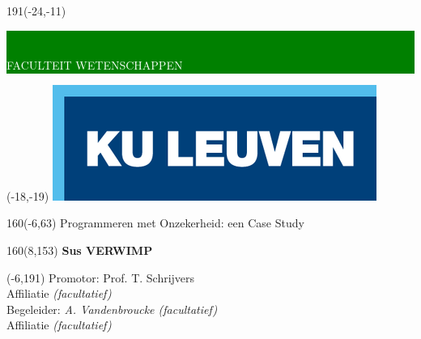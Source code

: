 \documentclass[12pt,a4paper,oneside]{book}
\begin{document}
\thispagestyle{empty}
\newcommand{\form}[1]{\scalebox{1.087}{\boldmath{#1}}}
\sffamily
%
\begin{textblock}{191}(-24,-11)
\colorbox{green}{\hspace{123mm}\ \parbox[c][18truemm]{68mm}{\textcolor{white}{FACULTEIT WETENSCHAPPEN}}}
\end{textblock}
%
\begin{textblock}{70}(-18,-19)
\textblockcolour{}
\includegraphics*[height=19.8truemm]{LogoKULeuven}
\end{textblock}
%
\begin{textblock}{160}(-6,63)
\textblockcolour{}
\vspace{-\parskip}
\flushleft
\fontsize{40}{42}\selectfont \textcolor{bluetitle}{Programmeren met Onzekerheid: een Case Study}\\[1.5mm]
\end{textblock}
%
\begin{textblock}{160}(8,153)
\textblockcolour{}
\vspace{-\parskip}
\flushright
\fontsize{14}{16}\selectfont \textbf{Sus VERWIMP}
\end{textblock}
%
\begin{textblock}{70}(-6,191)
\textblockcolour{}
\vspace{-\parskip}
\flushleft
Promotor: Prof. T. Schrijvers\\[-2pt]
\textcolor{blueaff}{Affiliatie \textsl{(facultatief)}}\\[5pt]
Begeleider: \textsl{A. Vandenbroucke (facultatief)}\\[-2pt]
\textcolor{blueaff}{Affiliatie \textsl{(facultatief)}}\\
\end{textblock}
\end{document}
